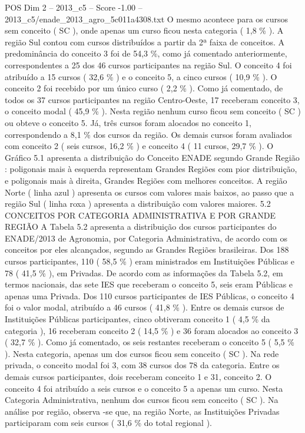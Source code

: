 \begin{textsample}{POS Dim 2 – 2013\_c5 – Score -1.00 – 2013\_c5/enade\_2013\_agro\_5c011a4308.txt}
O mesmo acontece para os cursos sem conceito ( SC ), onde apenas um curso ficou nesta categoria ( 1,8 \% ).
A região Sul contou com cursos distribuídos a partir da 2ª faixa de conceitos.
A predominância do conceito 3 foi de 54,3 \%, como já comentado anteriormente, correspondentes a 25 dos 46 cursos participantes na região Sul.
O conceito 4 foi atribuído a 15 cursos ( 32,6 \% ) e o conceito 5, a cinco cursos ( 10,9 \% ).
O conceito 2 foi recebido por um único curso ( 2,2 \% ).
Como já comentado, de todos os 37 cursos participantes na região Centro-Oeste, 17 receberam conceito 3, o conceito modal ( 45,9 \% ).
Nesta região nenhum curso ficou sem conceito ( SC ) ou obteve o conceito 5.
Já, três cursos foram alocados no conceito 1, correspondendo a 8,1 \% dos cursos da região.
Os demais cursos foram avaliados com conceito 2 ( seis cursos, 16,2 \% ) e conceito 4 ( 11 cursos, 29,7 \% ).
O Gráfico 5.1 apresenta a distribuição do Conceito ENADE segundo Grande Região : poligonais mais à esquerda representam Grandes Regiões com pior distribuição, e poligonais mais à direita, Grandes Regiões com melhores conceitos.
A região Norte ( linha azul ) apresenta os cursos com valores mais baixos, ao passo que a região Sul ( linha roxa ) apresenta a distribuição com valores maiores. 5.2 CONCEITOS POR CATEGORIA ADMINISTRATIVA E POR GRANDE REGIÃO A Tabela 5.2 apresenta a distribuição dos cursos participantes do ENADE/2013 de Agronomia, por Categoria Administrativa, de acordo com os conceitos por eles alcançados, segundo as Grandes Regiões brasileiras.
Dos 188 cursos participantes, 110 ( 58,5 \% ) eram ministrados em Instituições Públicas e 78 ( 41,5 \% ), em Privadas.
De acordo com as informações da Tabela 5.2, em termos nacionais, das sete IES que receberam o conceito 5, seis eram Públicas e apenas uma Privada.
Dos 110 cursos participantes de IES Públicas, o conceito 4 foi o valor modal, atribuído a 46 cursos ( 41,8 \% ).
Entre os demais cursos de Instituições Públicas participantes, cinco obtiveram conceito 1 ( 4,5 \% da categoria ), 16 receberam conceito 2 ( 14,5 \% ) e 36 foram alocados ao conceito 3 ( 32,7 \% ).
Como já comentado, os seis restantes receberam o conceito 5 ( 5,5 \% ).
Nesta categoria, apenas um dos cursos ficou sem conceito ( SC ).
Na rede privada, o conceito modal foi 3, com 38 cursos dos 78 da categoria.
Entre os demais cursos participantes, dois receberam conceito 1 e 31, conceito 2.
O conceito 4 foi atribuído a seis cursos e o conceito 5 a apenas um curso.
Nesta Categoria Administrativa, nenhum dos cursos ficou sem conceito ( SC ).
Na análise por região, observa -se que, na região Norte, as Instituições Privadas participaram com seis cursos ( 31,6 \% do total regional ).

\end{textsample}
